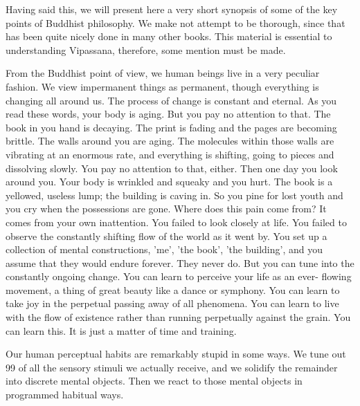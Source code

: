 Having said this, we will present here a very short synopsis of some of the key
points of Buddhist philosophy. We make not attempt to be thorough, since that
has been quite nicely done in many other books. This material is essential to
understanding Vipassana, therefore, some mention must be made.

From the Buddhist point of view, we human beings live in a very peculiar
fashion. We view impermanent things as permanent, though everything is changing
all around us. The process of change is constant and eternal. As you read these
words, your body is aging. But you pay no attention to that. The book in you
hand is decaying. The print is fading and the pages are becoming brittle. The
walls around you are aging. The molecules within those walls are vibrating at an
enormous rate, and everything is shifting, going to pieces and dissolving
slowly. You pay no attention to that, either. Then one day you look around you.
Your body is wrinkled and squeaky and you hurt. The book is a yellowed, useless
lump; the building is caving in. So you pine for lost youth and you cry when the possessions
are gone. Where does this pain come from? It comes from your own inattention.
You failed to look closely at life. You failed to observe the constantly
shifting flow of the world as it went by. You set up a collection of mental
constructions, 'me', 'the book', 'the building', and you assume that they would
endure forever. They never do. But you can tune into the constantly ongoing
change. You can learn to perceive your life as an ever- flowing movement, a
thing of great beauty like a dance or symphony. You can learn to take joy in the
perpetual passing away of all phenomena. You can learn to live with the flow of
existence rather than running perpetually against the grain. You can learn this.
It is just a matter of time and training.

Our human perceptual habits are remarkably stupid in some ways. We tune out 99%
of all the sensory stimuli we actually receive, and we solidify the remainder
into discrete mental objects. Then we react to those mental objects in
programmed habitual ways.

